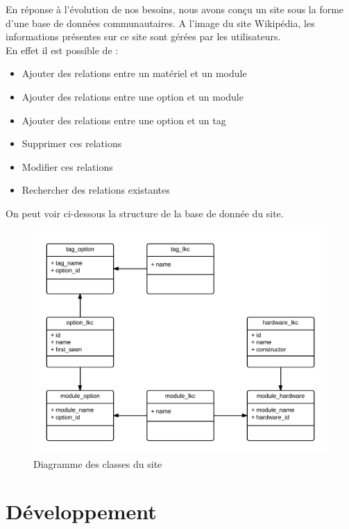 \documentclass[17pts]{report}
\begin{document}
En réponse à l'évolution de nos besoins, nous avons conçu un site sous la forme
d'une base de données communautaires. A l'image du site Wikipédia, les
informations présentes sur ce site sont gérées par les utilisateurs.\\

En effet il est possible de : \\


\begin{itemize}
    \item Ajouter des relations entre un matériel et un module
    \item Ajouter des relations entre une option et un module
    \item Ajouter des relations entre une option et un tag
    \item Supprimer ces relations
    \item Modifier ces relations
    \item Rechercher des relations existantes
\end{itemize}

On peut voir ci-dessous la structure de la base de donnée du site. \\

\begin{figure}[H]
    \includegraphics[scale=0.2]{./illustrations/diagramme_classes_site.png}
    \centering
    \caption{Diagramme des classes du site}
    \label{fig:DiagSite}
\end{figure}


\chapter{Développement}\thispagestyle{IHA-fancy-style}
\label{cha:Développement}
\end{document}
